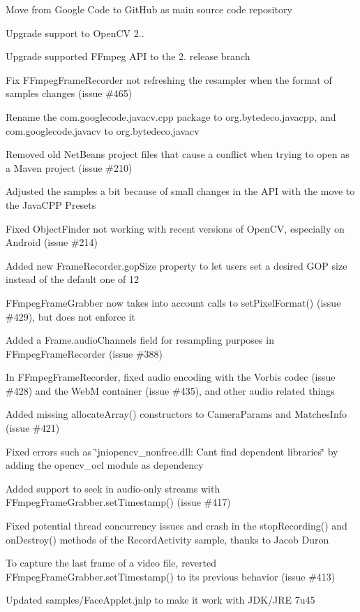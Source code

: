 \begin{DoxyItemize}
\item Move from Google Code to Git\+Hub as main source code repository
\item Upgrade support to Open\+C\+V 2..
\item Upgrade supported F\+Fmpeg A\+P\+I to the 2. release branch
\item Fix {\ttfamily F\+Fmpeg\+Frame\+Recorder} not refreshing the resampler when the format of samples changes (issue \#465)
\item Rename the {\ttfamily com.\+googlecode.\+javacv.\+cpp} package to {\ttfamily org.\+bytedeco.\+javacpp}, and {\ttfamily com.\+googlecode.\+javacv} to {\ttfamily org.\+bytedeco.\+javacv}
\item Removed old Net\+Beans project files that cause a conflict when trying to open as a Maven project (issue \#210)
\item Adjusted the samples a bit because of small changes in the A\+P\+I with the move to the Java\+C\+P\+P Presets
\item Fixed {\ttfamily Object\+Finder} not working with recent versions of Open\+C\+V, especially on Android (issue \#214)
\item Added new {\ttfamily Frame\+Recorder.\+gop\+Size} property to let users set a desired G\+O\+P size instead of the default one of 12
\item {\ttfamily F\+Fmpeg\+Frame\+Grabber} now takes into account calls to {\ttfamily set\+Pixel\+Format()} (issue \#429), but does not enforce it
\item Added a {\ttfamily Frame.\+audio\+Channels} field for resampling purposes in {\ttfamily F\+Fmpeg\+Frame\+Recorder} (issue \#388)
\item In {\ttfamily F\+Fmpeg\+Frame\+Recorder}, fixed audio encoding with the Vorbis codec (issue \#428) and the Web\+M container (issue \#435), and other audio related things
\item Added missing {\ttfamily allocate\+Array()} constructors to {\ttfamily Camera\+Params} and {\ttfamily Matches\+Info} (issue \#421)
\item Fixed errors such as \char`\"{}jniopencv\+\_\+nonfree.\+dll\+: Can\textquotesingle{}t find dependent libraries\char`\"{} by adding the {\ttfamily opencv\+\_\+ocl} module as dependency
\item Added support to seek in audio-\/only streams with {\ttfamily F\+Fmpeg\+Frame\+Grabber.\+set\+Timestamp()} (issue \#417)
\item Fixed potential thread concurrency issues and crash in the {\ttfamily stop\+Recording()} and {\ttfamily on\+Destroy()} methods of the {\ttfamily Record\+Activity} sample, thanks to Jacob Duron
\item To capture the last frame of a video file, reverted {\ttfamily F\+Fmpeg\+Frame\+Grabber.\+set\+Timestamp()} to its previous behavior (issue \#413)
\item Updated {\ttfamily samples/\+Face\+Applet.\+jnlp} to make it work with J\+D\+K/\+J\+R\+E 7u45
\end{DoxyItemize}

